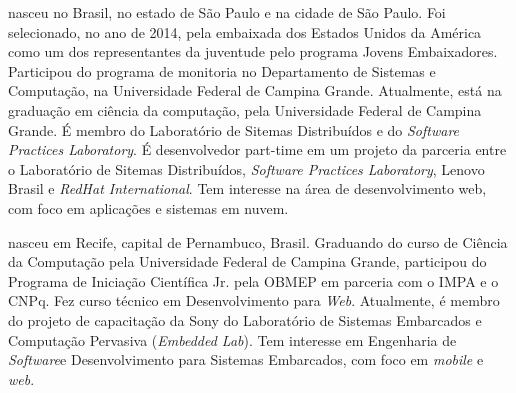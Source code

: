 \documentclass{classe_cn}                 %
\begin{document}
\vspace{1.0cm}
 nasceu no Brasil, no estado de São Paulo e na cidade de São Paulo. Foi selecionado, no ano de 2014, pela embaixada dos Estados Unidos da América como um dos representantes da juventude pelo programa Jovens Embaixadores. Participou do programa de monitoria no Departamento de Sistemas e Computação, na Universidade Federal de Campina Grande. Atualmente, está na graduação em ciência da computação, pela Universidade Federal de Campina Grande. É membro do Laboratório de Sitemas Distribuídos e do \textit{Software Practices Laboratory}. É desenvolvedor part-time em um projeto da parceria entre o Laboratório de Sitemas Distribuídos, \textit{Software Practices Laboratory}, Lenovo Brasil e \textit{RedHat International}. Tem interesse na área de desenvolvimento web, com foco em aplicações e sistemas em nuvem.

\vspace{1.0cm}
 nasceu em Recife, capital de Pernambuco, Brasil. Graduando do curso de Ciência da Computação pela Universidade Federal de Campina Grande, participou do Programa de Iniciação Científica Jr. pela OBMEP em parceria com o IMPA e o CNPq. Fez curso técnico em Desenvolvimento para \textit{Web}. Atualmente, é membro do projeto de capacitação da Sony do Laboratório de Sistemas Embarcados e Computação Pervasiva (\textit{Embedded Lab}). Tem interesse em Engenharia de \textit{Software}e Desenvolvimento para Sistemas Embarcados, com foco em \textit{mobile} e \textit{web}.
\end{document}
